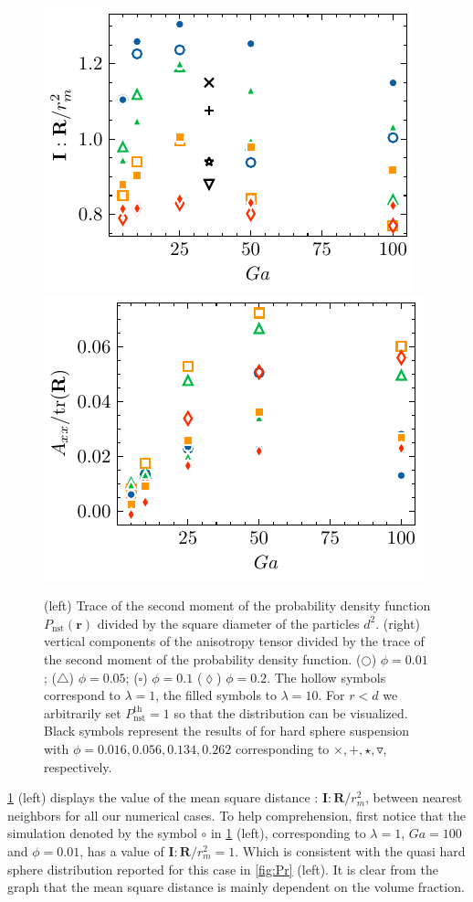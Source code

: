 \begin{figure}[h!]
    \centering
    \includegraphics[height=0.3\textwidth]{image/HOMOGENEOUS_NEW/PA/trR.pdf}
    \includegraphics[height=0.3\textwidth]{image/HOMOGENEOUS_NEW/PA/Axx.pdf}
    \caption{
        (left) Trace of the second moment of the probability density function $P_\text{nst}(\textbf{r})$ divided by the square diameter of the particles $d^2$. 
        (right) vertical components of the anisotropy tensor divided by the trace of the second moment of the probability density function.
    ($\pmb\bigcirc$) $\phi = 0.01$; ($\pmb\triangle$) $ \phi = 0.05$; ($\pmb\square$) $\phi = 0.1$ ($\pmb\lozenge$) $\phi = 0.2$.
    The hollow symbols correspond to $\lambda = 1$, the filled symbols to $\lambda = 10$.
    For $r<d$ we arbitrarily set $P_\text{nst}^\text{th} = 1$ so that the distribution can be visualized.
    Black symbols represent the results of \citet{zhang2023evolution} for hard sphere suspension with $\phi = 0.016,0.056,0.134,0.262$  %
    corresponding to $\pmb\times,\pmb +, \pmb\star , \pmb\triangledown$, respectively.
    }
    \label{fig:A}
\end{figure}
\ref{fig:A} (left) displays the value of the mean square distance : $\textbf{I}:\textbf{R}/r_m^2$, between nearest neighbors for all our numerical cases. 
To help comprehension, first notice that the simulation denoted by the symbol \textcolor{col1}{$\pmb\circ$} in \ref{fig:A} (left), corresponding to $\lambda = 1$, $Ga = 100$ and $\phi = 0.01$, has a value of $\textbf{I}:\textbf{R}/r_m^2 = 1$. Which is consistent with the quasi hard sphere distribution reported for this case in \ref{fig:Pr} (left). 
It is clear from the graph that the mean square distance is mainly dependent on the volume fraction. 
